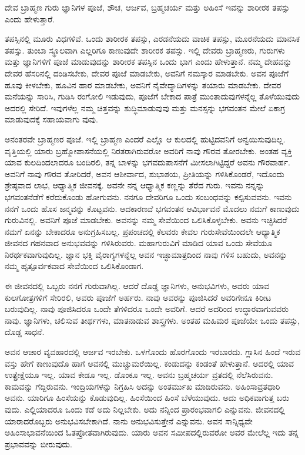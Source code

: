 {\small ದೇವ ಬ್ರಾಹ್ಮಣ ಗುರು ಜ್ಞಾನಿಗಳ ಪೂಜೆ, ಶೌಚ, ಆರ್ಜವ, ಬ್ರಹ್ಮಚರ್ಯ ಮತ್ತು ಅಹಿಂಸೆ ಇವನ್ನು ಶಾರೀರಕ ತಪಸ್ಸು ಎಂದು ಹೇಳುತ್ತಾರೆ.}

ತಪಸ್ಸಿನಲ್ಲಿ ಮೂರು ವಿಧಗಳಿವೆ. ಒಂದು ಶಾರೀರಕ ತಪಸ್ಸು, ಎರಡನೆಯದು ವಾಚಿಕ ತಪಸ್ಸು, ಮೂರನೆಯದು ಮಾನಸಿಕ ತಪಸ್ಸು. ತುಂಬಾ ಸ್ಥೂಲವಾಗಿ ಎಲ್ಲರಿಗೂ ಕಾಣುವುದೇ ಶಾರೀರಕ ತಪಸ್ಸು. ಇಲ್ಲಿ ದೇವರು ಬ್ರಾಹ್ಮಣರು, ಗುರುಗಳು ಮತ್ತು ಜ್ಞಾನಿಗಳಿಗೆ ಪೂಜೆ ಮಾಡುವುದನ್ನು ಶಾರೀರಕ ತಪಸ್ಸಿನ ಒಂದು ಭಾಗ ಎಂದು ಹೇಳುತ್ತಾನೆ. ನಮ್ಮ ದೇಹವನ್ನು ದೇವರ ಹೆಸರಿನಲ್ಲಿ ದಂಡಿಸಬೇಕು, ದೇವರ ಪೂಜೆ ಮಾಡಬೇಕು, ಅವನಿಗೆ ನಮಸ್ಕಾರ ಮಾಡಬೇಕು. ಅವನ ಪೂಜೆಗೆ ಹೂವು ಕೀಳಬೇಕು, ಹೂವಿನ ಹಾರ ಮಾಡಬೇಕು, ಅವನಿಗೆ ನೈವೇದ್ಯಾದಿಗಳನ್ನು ತಯಾರು ಮಾಡಬೇಕು. ದೇವರ ಮನೆಯನ್ನು ಸಾರಿಸಿ, ಗುಡಿಸಿ ರಂಗೋಲಿ ಇಡುವುದು, ಪೂಜೆಗೆ ಬೇಕಾದ ಪಾತ್ರೆ ಮುಂತಾದುವುಗಳನ್ನೆಲ್ಲ ತೊಳೆಯುವುದು ಅದರಲ್ಲಿ ಸೇರಿದೆ. ಇವುಗಳೆಲ್ಲ ನಮ್ಮ ಚಿತ್ತವನ್ನು ಶುದ್ಧಿಮಾಡುವುವು ಮತ್ತು ಮನಸ್ಸನ್ನು ಭಗವಂತನ ಮೇಲೆ ಏಕಾಗ್ರ ಮಾಡುವುದಕ್ಕೆ ಸಹಾಯವಾಗು ವುವು.

ಅನಂತರವೇ ಬ್ರಾಹ್ಮಣರ ಪೂಜೆ. ಇಲ್ಲಿ ಬ್ರಾಹ್ಮಣ ಎಂದರೆ ಎಲ್ಲೊ ಆ ಕುಲದಲ್ಲಿ ಹುಟ್ಟಿದವನಿಗೆ ಅನ್ವಯಿಸುವುದಿಲ್ಲ. ವೃತ್ತಿಯಲ್ಲಿ ಯಾರು ಬ್ರಹ್ಮೋಪಾಸನೆಯಲ್ಲಿ ನಿರತರಾಗಿರುವರೋ ಅವರಿಗೆ ನಾವು ಗೌರವ ತೋರಬೇಕು. ಅಂತಹ ವ್ಯಕ್ತಿ ಯಾವ ಕುಲದಿಂದಲಾದರೂ ಬಂದಿರಲಿ, ತನ್ನ ಬಾಳನ್ನು ಭಗವದುಪಾಸನೆಗೆ ಮೀಸಲಾಗಿಟ್ಟಿದ್ದರೆ ಅವನು ಗೌರವಾರ್ಹ. ಅವನಿಗೆ ನಾವು ಗೌರವ ತೋರಿದರೆ, ಅವನ ಆಶೀರ್ವಾದ, ಶುಭಾಶಯ, ಪ್ರೀತಿಯನ್ನು ಗಳಿಸಿಕೊಂಡರೆ, ಇದೊಂದು ಶ್ರೇಷ್ಠವಾದ ಲಾಭ, ಆಧ್ಯಾತ್ಮಿಕ ಜೀವನಕ್ಕೆ. ಅವನೇ ನನ್ನ ಆಧ್ಯಾತ್ಮಿಕ ಕಣ್ಣನ್ನು ತೆರೆದ ಗುರು. ಇವನು ನನ್ನನ್ನು ಭಗವಂತನೆಡೆಗೆ ಕರೆದುಕೊಂಡು ಹೋಗುವನು. ನನಗೂ ದೇವರಿಗೂ ಒಂದು ಸಂಬಂಧವನ್ನು ಕಲ್ಪಿಸುವವನು. ಇವನು ನನಗೆ ಒಂದು ಹೊಸ ಜನ್ಮವನ್ನು ಕೊಟ್ಟವನು. ಆದಕಾರಣವೆ ಭಗವಂತನ ಆವಿರ್ಭಾವನೆ ಮೊದಲು ನಮಗೆ ಕಾಣುವುದು ಗುರುವಿನಲ್ಲಿ. ಅವನಿಗೆ ಪೂಜೆ ಮಾಡಬೇಕು. ಅವನನ್ನು ನಮ್ಮ ಸೇವೆಯಿಂದ ಒಲಿಸಿಕೊಳ್ಳಬೇಕು. ಅವನು ಇಚ್ಛಿಸಿದರೆ ನಮಗೆ ಏನನ್ನು ಬೇಕಾದರೂ ಅನುಗ್ರಹಿಸಬಲ್ಲ. ಪ್ರಪಂಚದಲ್ಲಿ ಕೆಲವರು ಕೇವಲ ಗುರುಸೇವೆಯಿಂದಲೇ ಆಧ್ಯಾತ್ಮಿಕ ಜೀವನದ ಗಹನವಾದ ಅನುಭವವನ್ನು ಗಳಿಸಿರುವರು. ಮಹಾಗುರುವಿಗೆ ಮಾಡಿದ ಯಾವ ಒಂದು ಸೇವೆಯೂ ನಿರರ್ಥಕವಾಗುವುದಿಲ್ಲ. ಜ್ಞಾನ ಭಕ್ತಿ ವೈರಾಗ್ಯಗಳನ್ನೆಲ್ಲ ಅವನ ಇಚ್ಛಾಮಾತ್ರದಿಂದ ನಾವು ಗಳಿಸ ಬಹುದು, ಅವನನ್ನು ನಮ್ಮ ಹೃತ್ಪೂರ್ವಕವಾದ ಸೇವೆಯಿಂದ ಒಲಿಸಿಕೊಂಡಾಗ.

ಈ ಜೀವನದಲ್ಲಿ ಒಬ್ಬರು ನನಗೆ ಗುರುವಾಗಿಲ್ಲ. ಆದರೆ ದೊಡ್ಡ ಜ್ಞಾನಿಗಳು, ಅನುಭವಿಗಳು, ಅವರು ಯಾವ ಕುಲಗೋತ್ರಗಳಿಗೆ ಸೇರಿರಲಿ, ಅವರು ಪೂಜೆಗೆ ಅರ್ಹರು. ನಾವು ಅವರನ್ನು ಪೂಜಿಸಿದರೆ ಅವರಿಗೇನೂ ಕಿರೀಟ ಬರುವುದಿಲ್ಲ. ನಾವು ಪೂಜಿಸಿದರೂ ಒಂದೇ ತೆಗಳಿದರೂ ಒಂದೇ ಅವರಿಗೆ. ಆದರೆ ಅದರಿಂದ ಉದ್ಧಾರವಾಗುವವರು ನಾವು. ಜ್ಞಾನಿಗಳು, ಚಲಿಸುವ ತೀರ್ಥಗಳು, ಮಾತನಾಡುವ ಶಾಸ್ತ್ರಗಳು. ಅಂತಹ ಮಹಿಮರ ಪೂಜೆಯೇ ಒಂದು ತಪಸ್ಸು, ದೊಡ್ಡ ಸಾಧನೆ. 

ಅವನ ಆಚಾರ ವ್ಯವಹಾರದಲ್ಲಿ ಆರ್ಜವ ಇರಬೇಕು. ಒಳಗೊಂದು ಹೊರಗೊಂದು ಇರಬಾರದು. ಗ್ಲಾಸಿನ ಹಿಂದೆ ಇರುವ ವಸ್ತು ಹೇಗೆ ಕಾಣುವುದೊ ಹಾಗೆ ಅವನಲ್ಲಿ ಮುಚ್ಚುಮರೆಯಿಲ್ಲ. ಕಂಡುದನ್ನು ಕಂಡಂತೆ ಹೇಳುತ್ತಾನೆ. ಅದರಲ್ಲಿ ಯಾವ ಉತ್ಪ್ರೇಕ್ಷೆಯೂ ಇಲ್ಲ. ಯಾವ ಕೇಡೂ ಇಲ್ಲ. ಡೊಂಕೂ ಇಲ್ಲ. ಅವನು ಬ್ರಹ್ಮಚರ್ಯ ವ್ರತದಲ್ಲಿ ನೆಲೆಸಿರುವನು. ಕಾಮವನ್ನು ಗೆದ್ದಿರುವನು. ಇಂದ್ರಿಯಗಳನ್ನು ನಿಗ್ರಹಿಸಿ ಅದನ್ನು ಅಂತರ್ಮುಖ ಮಾಡಿರುವನು. ಅಹಿಂಸಾವ್ರತಧಾರಿ ಅವನು. ಯಾರಿಗೂ ಹಿಂಸೆಯನ್ನು ಕೊಡುವುದಿಲ್ಲ. ಹಿಂಸೆಯಿಂದ ಹಿಂಸೆ ಬೆಳೆಯುವುದು. ಅದು ಅಧಿಕವಾಗುತ್ತ ಬರು ವುದು. ಎಲ್ಲಿಯಾದರೂ ಒಂದು ಕಡೆ ಅದು ನಿಲ್ಲಬೇಕು. ಅದು ನನ್ನಿಂದ ಪ್ರಾರಂಭವಾಗಲಿ ಎನ್ನುವನು. ಜೀವನದಲ್ಲಿ ಯಾರಾದರೊಬ್ಬರು ಅನುಭವಿಸಬೇಕಾಗಿದೆ. ನಾನು ಅನುಭವಿಸುತ್ತೇನೆ ಎನ್ನುವನು. ಅವನ ಸಾನ್ನಿಧ್ಯವೇ ಅಹಿಂಸಾಭಾವನೆಯಿಂದ ಓತಪ್ರೋತವಾಗಿರುವುದು. ಯಾರು ಅವನ ಸಮೀಪದಲ್ಲಿರುವರೋ ಅವರ ಮೇಲೆಲ್ಲ ಇದು ತನ್ನ ಪ್ರಭಾವವನ್ನು ಬೀರುವುದು.

